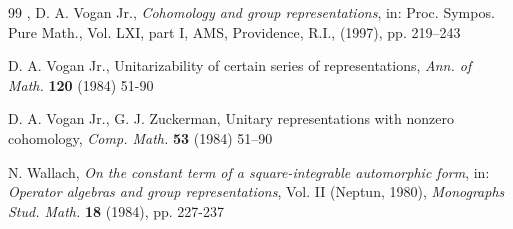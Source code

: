 \begin{thebibliography}{99}
, D. A. Vogan Jr., {\it Cohomology and group representations}, in: Proc. Sympos. Pure Math., Vol. LXI, part I, AMS, Providence, R.I., (1997), pp. 219--243

 D. A. Vogan Jr., Unitarizability of certain series of representations, {\it Ann. of Math.} {\bf 120} (1984) 51-90


 D. A. Vogan Jr., G. J. Zuckerman, Unitary representations with nonzero cohomology, {\it Comp. Math.} \textbf{53} (1984) 51--90


 N. Wallach, {\it On the constant term of a square-integrable automorphic form}, in: {\it Operator algebras and group representations}, Vol. II (Neptun, 1980), {\it Monographs Stud. Math.} \textbf{18} (1984), pp. 227-237


\end{thebibliography}
